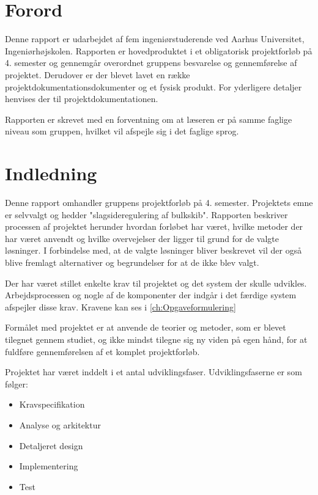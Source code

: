 \chapter{Forord}
Denne rapport er udarbejdet af fem ingeniørstuderende ved Aarhus Universitet, Ingeniørhøjskolen. Rapporten er hovedproduktet i et obligatorisk projektforløb på 4. semester og gennemgår overordnet gruppens besvarelse og gennemførelse af projektet. Derudover er der blevet lavet en række projektdokumentationsdokumenter og et fysisk produkt. For yderligere detaljer henvises der til projektdokumentationen.
 
Rapporten er skrevet med en forventning om at læseren er på samme faglige niveau som gruppen, hvilket vil afspejle sig i det faglige sprog. 

\chapter{Indledning}
Denne rapport omhandler gruppens projektforløb på 4. semester. Projektets emne er selvvalgt og hedder "slagsideregulering af bulkskib". Rapporten beskriver processen af projektet herunder hvordan forløbet har været, hvilke metoder der har været anvendt og hvilke overvejelser der ligger til grund for de valgte løsninger. I forbindelse med, at de valgte løsninger bliver beskrevet vil der også blive fremlagt alternativer og begrundelser for at de ikke blev valgt.

Der har været stillet enkelte krav til projektet og det system der skulle udvikles. Arbejdsprocessen og nogle af de komponenter der indgår i det færdige system afspejler disse krav. Kravene kan ses i \ref{ch:Opgaveformulering}

Formålet med projektet er at anvende de teorier og metoder, som er blevet tilegnet gennem studiet, og ikke mindst tilegne sig ny viden på egen hånd, for at fuldføre gennemførelsen af et komplet projektforløb.

Projektet har været inddelt i et antal udviklingsfaser. Udviklingsfaserne er som følger:
\begin{itemize}
\item Kravspecifikation
\item Analyse og arkitektur
\item Detaljeret design
\item Implementering
\item Test
\end{itemize}


